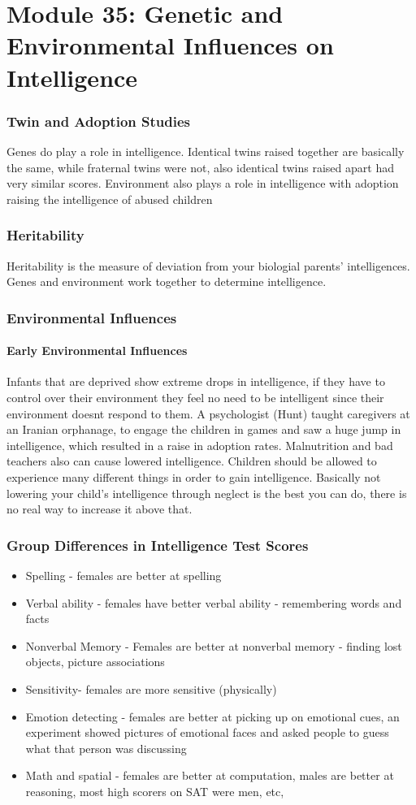 \documentclass[12pt]{article}
\begin{document}
\part*{Module 35: Genetic and Environmental Influences on Intelligence}
\section*{Twin and Adoption Studies}
Genes do play a role in intelligence. Identical twins raised together are basically the same, while fraternal twins were not, also identical twins raised apart had very similar scores. Environment also plays a role in intelligence with adoption raising the intelligence of abused children
\section*{Heritability}
Heritability is the measure of deviation from your biologial parents' intelligences. Genes and environment work together to determine intelligence.
\section*{Environmental Influences}
\subsection*{Early Environmental Influences}
Infants that are deprived show extreme drops in intelligence, if they have to control over their environment they feel no need to be intelligent since their environment doesnt respond to them. A psychologist (Hunt) taught caregivers at an Iranian orphanage, to engage the children in games and saw a huge jump in intelligence, which resulted in a raise in adoption rates. Malnutrition and bad teachers also can cause lowered intelligence. Children should be allowed to experience many different things in order to gain intelligence. Basically not lowering your child's intelligence through neglect is the best you can do, there is no real way to increase it above that. 
\section*{Group Differences in Intelligence Test Scores}
\begin{itemize}
\item Spelling - females are better at spelling
\item Verbal ability - females have better verbal ability - remembering words and facts
\item Nonverbal Memory - Females are better at nonverbal memory - finding lost objects, picture associations
\item Sensitivity- females are more sensitive (physically) 
\item Emotion detecting  - females are better at picking up on emotional cues, an experiment showed pictures of emotional faces and asked people to guess what that person was discussing
\item Math and spatial - females are better at computation, males are better at reasoning, most high scorers on SAT were men, etc, 	
\end{itemize}
\end{document}
